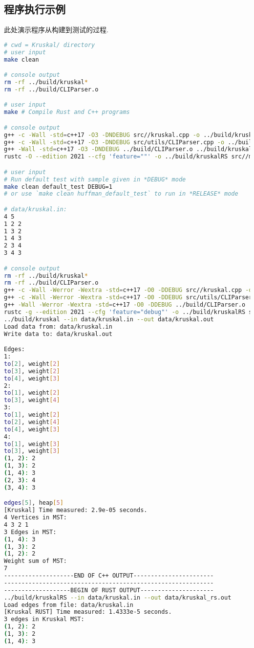 \subsection{程序执行示例}
\label{sec:dpBench}
此处演示程序从构建到测试的过程.
\begin{lstlisting}[language=bash]
# cwd = Kruskal/ directory
# user input
make clean

# console output
rm -rf ../build/kruskal*
rm -rf ../build/CLIParser.o

# user input
make # Compile Rust and C++ programs

# console output
g++ -c -Wall -std=c++17 -O3 -DNDEBUG src//kruskal.cpp -o ../build/kruskal.o
g++ -c -Wall -std=c++17 -O3 -DNDEBUG src/utils/CLIParser.cpp -o ../build/CLIParser.o
g++ -Wall -std=c++17 -O3 -DNDEBUG ../build/CLIParser.o ../build/kruskal.o -o ../build/kruskal
rustc -O --edition 2021 --cfg 'feature=""' -o ../build/kruskalRS src//main.rs

# user input
# Run default test with sample given in *DEBUG* mode
make clean default_test DEBUG=1
# or use `make clean huffman_default_test` to run in *RELEASE* mode

# data/kruskal.in:
4 5
1 2 2
1 3 2
1 4 3
2 3 4
3 4 3

# console output
rm -rf ../build/kruskal*
rm -rf ../build/CLIParser.o
g++ -c -Wall -Werror -Wextra -std=c++17 -O0 -DDEBUG src//kruskal.cpp -o ../build/kruskal.o
g++ -c -Wall -Werror -Wextra -std=c++17 -O0 -DDEBUG src/utils/CLIParser.cpp -o ../build/CLIParser.o
g++ -Wall -Werror -Wextra -std=c++17 -O0 -DDEBUG ../build/CLIParser.o ../build/kruskal.o -o ../build/kruskal
rustc -g --edition 2021 --cfg 'feature="debug"' -o ../build/kruskalRS src//main.rs
../build/kruskal --in data/kruskal.in --out data/kruskal.out
Load data from: data/kruskal.in
Write data to: data/kruskal.out

Edges:
1:
to[2], weight[2]
to[3], weight[2]
to[4], weight[3]
2:
to[1], weight[2]
to[3], weight[4]
3:
to[1], weight[2]
to[2], weight[4]
to[4], weight[3]
4:
to[1], weight[3]
to[3], weight[3]
(1, 2): 2
(1, 3): 2
(1, 4): 3
(2, 3): 4
(3, 4): 3

edges[5], heap[5]
[Kruskal] Time measured: 2.9e-05 seconds.
4 Vertices in MST:
4 3 2 1
3 Edges in MST:
(1, 4): 3
(1, 3): 2
(1, 2): 2
Weight sum of MST:
7
--------------------END OF C++ OUTPUT-----------------------
------------------------------------------------------------
-------------------BEGIN OF RUST OUTPUT---------------------
../build/kruskalRS --in data/kruskal.in --out data/kruskal_rs.out
Load edges from file: data/kruskal.in
[Kruskal RUST] Time measured: 1.4333e-5 seconds.
3 edges in Kruskal MST:
(1, 2): 2
(1, 3): 2
(1, 4): 3


\end{lstlisting}
